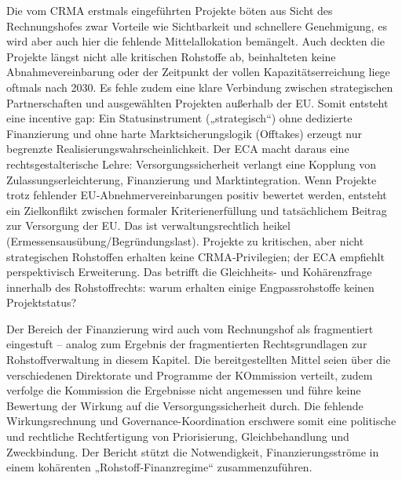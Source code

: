 \documentclass[12pt,a4paper,oneside]{book} %
\begin{document}
Die vom CRMA erstmals eingeführten Projekte böten aus Sicht des Rechnungshofes zwar Vorteile wie Sichtbarkeit und schnellere Genehmigung, es wird aber auch hier die fehlende Mittelallokation bemängelt. Auch deckten die Projekte längst nicht alle kritischen Rohstoffe ab, beinhalteten keine Abnahmevereinbarung oder der Zeitpunkt der vollen Kapazitätserreichung liege oftmals nach 2030. Es fehle zudem eine klare Verbindung zwischen strategischen Partnerschaften und ausgewählten Projekten außerhalb der EU. Somit entsteht eine incentive gap:  Ein Statusinstrument („strategisch“) ohne dedizierte Finanzierung und ohne harte Marktsicherungslogik (Offtakes) erzeugt nur begrenzte Realisierungswahrscheinlichkeit. Der ECA macht daraus eine rechtsgestalterische Lehre: Versorgungssicherheit verlangt eine Kopplung von Zulassungserleichterung, Finanzierung und Marktintegration. Wenn Projekte trotz fehlender EU‑Abnehmervereinbarungen positiv bewertet werden, entsteht ein Zielkonflikt zwischen formaler Kriterienerfüllung und tatsächlichem Beitrag zur Versorgung der EU. Das ist verwaltungsrechtlich heikel (Ermessensausübung/Begründungslast). Projekte zu kritischen, aber nicht strategischen Rohstoffen erhalten keine CRMA‑Privilegien; der ECA empfiehlt perspektivisch Erweiterung. Das betrifft die Gleichheits- und Kohärenzfrage innerhalb des Rohstoffrechts: warum erhalten einige Engpassrohstoffe keinen Projektstatus?

Der Bereich der Finanzierung wird auch vom Rechnungshof als fragmentiert eingestuft -- analog zum Ergebnis der fragmentierten Rechtsgrundlagen zur Rohstoffverwaltung in diesem Kapitel. Die bereitgestellten Mittel seien über die verschiedenen Direktorate und Programme der KOmmission verteilt, zudem verfolge die Kommission die Ergebnisse nicht angemessen und führe keine Bewertung der Wirkung auf die Versorgungssicherheit durch. Die fehlende Wirkungsrechnung und Governance-Koordination erschwere somit eine politische und rechtliche Rechtfertigung von Priorisierung, Gleichbehandlung und Zweckbindung. Der Bericht stützt die Notwendigkeit, Finanzierungsströme in einem kohärenten „Rohstoff‑Finanzregime“ zusammenzuführen.
\end{document}
